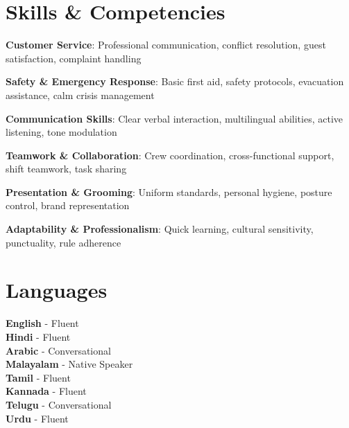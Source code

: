 \documentclass[a4paper,11pt]{article}
\begin{document}
\section{Skills \& Competencies}
\begin{itemize}[leftmargin=0.15in, label={}, itemsep=0pt]
    \small{
    \item \textbf{Customer Service}: Professional communication, conflict resolution, guest satisfaction, complaint handling
    \item \textbf{Safety \& Emergency Response}: Basic first aid, safety protocols, evacuation assistance, calm crisis management
    \item \textbf{Communication Skills}: Clear verbal interaction, multilingual abilities, active listening, tone modulation
    \item \textbf{Teamwork \& Collaboration}: Crew coordination, cross-functional support, shift teamwork, task sharing
    \item \textbf{Presentation \& Grooming}: Uniform standards, personal hygiene, posture control, brand representation
    \item \textbf{Adaptability \& Professionalism}: Quick learning, cultural sensitivity, punctuality, rule adherence
}
\end{itemize}

\section{Languages}
\begin{itemize}[leftmargin=0.15in, label={}]
    \small{\item{
                \textbf{English   }{- Fluent}\\
                \textbf{Hindi     }{- Fluent}\\
                \textbf{Arabic    }{- Conversational}\\
                \textbf{Malayalam }{- Native Speaker}\\
                \textbf{Tamil     }{- Fluent}\\
                \textbf{Kannada   }{- Fluent}\\
                \textbf{Telugu    }{- Conversational}\\
                \textbf{Urdu      }{- Fluent}
                }}
\end{itemize}
\end{document}
